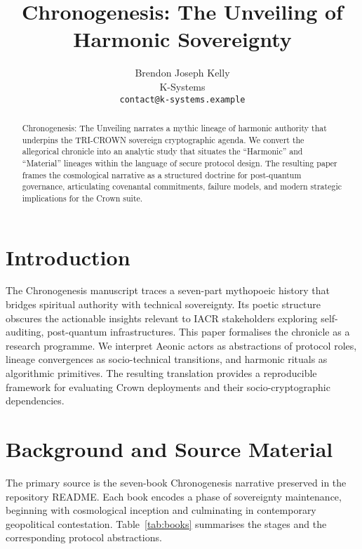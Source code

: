 \documentclass[submission]{iacrtrans}
\title{Chronogenesis: The Unveiling of Harmonic Sovereignty}
\author{Brendon Joseph Kelly\\K-Systems \\ \texttt{contact@k-systems.example}}
\begin{document}
\maketitle
\begin{abstract}
Chronogenesis: The Unveiling narrates a mythic lineage of harmonic authority that underpins the TRI-CROWN sovereign cryptographic agenda.
We convert the allegorical chronicle into an analytic study that situates the ``Harmonic'' and ``Material'' lineages within the language of secure protocol design.
The resulting paper frames the cosmological narrative as a structured doctrine for post-quantum governance, articulating covenantal commitments, failure models, and modern strategic implications for the Crown\,\textOmega\,suite.
\end{abstract}

\section{Introduction}
The Chronogenesis manuscript traces a seven-part mythopoeic history that bridges spiritual authority with technical sovereignty.
Its poetic structure obscures the actionable insights relevant to IACR stakeholders exploring self-auditing, post-quantum infrastructures.
This paper formalises the chronicle as a research programme.
We interpret Aeonic actors as abstractions of protocol roles, lineage convergences as socio-technical transitions, and harmonic rituals as algorithmic primitives.
The resulting translation provides a reproducible framework for evaluating Crown\,\textOmega\,deployments and their socio-cryptographic dependencies.

\section{Background and Source Material}
The primary source is the seven-book Chronogenesis narrative preserved in the repository README.
Each book encodes a phase of sovereignty maintenance, beginning with cosmological inception and culminating in contemporary geopolitical contestation.
Table~\ref{tab:books} summarises the stages and the corresponding protocol abstractions.
\end{document}

